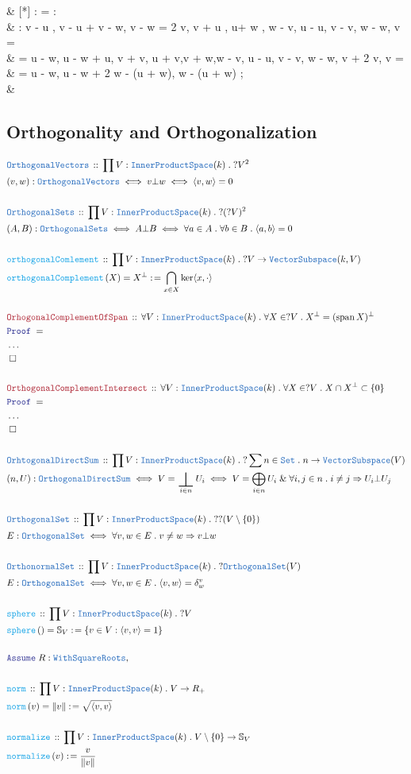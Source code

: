 \documentclass[12pt]{scrartcl}%
\newcommand{\TYPE}[1]{\textcolor{NavyBlue}{\mathtt{#1}}}%
\newcommand{\FUNC}[1]{\textcolor{Cerulean}{\mathtt{#1}}}%
\newcommand{\LOGIC}[1]{\textcolor{Blue}{\mathtt{#1}}}%
\newcommand{\THM}[1]{\textcolor{Maroon}{\mathtt{#1}}}%
\renewcommand{\.}{\; . \;} %
\newcommand{\de}{: \kern 0.1pc =} %
\newcommand{\Act}[1]{\left( #1 \right)} %
\newcommand{\Theorem}[2]{& \THM{#1} \, :: \, #2 \\ & \Proof = \\ } %
\newcommand{\DeclareType}[2]{& \TYPE{#1} \, :: \, #2 \\}%
\newcommand{\DefineType}[3]{& #1 : \TYPE{#2} \iff #3 \\}%
\newcommand{\DefineNamedType}[4]{& #1 : \TYPE{#2} \iff #3 \iff #4 \\}%
\newcommand{\DeclareFunc}[2]{& \FUNC{#1} \, :: \, #2 \\}%
\newcommand{\DefineFunc}[3]{&  \FUNC{#1}\Act{#2} \de #3 \\}%
\newcommand{\DefineNamedFunc}[4]{&  \FUNC{#1}\Act{#2} = #3 \de #4 \\}%
\newcommand{\NewLine}{\\ & \kern 1pc}%
\newcommand{\Page}[1]{ \begin{align*} #1 \end{align*}  }%
\newcommand{\NoProof}{ & \ldots \\ \EndProof}%
\renewcommand{\And}{\; \& \;}%
\newcommand{\Set}{\TYPE{Set}} %
\newcommand{\Conclude}[3]{& #1 \de #2 : #3; \\}%
\newcommand{\Assume}[2]{& \LOGIC{Assume} \; #1 : #2, \\} %
\newcommand{\QED}{\; \square} %
\newcommand{\EndProof}{& \QED \\} %
\newcommand{\Proof}{\LOGIC{Proof} \; } %
\newcommand{\IPS}{\TYPE{InnerProductSpace}}
\DeclareMathOperator{\Span}{span} %
\DeclareMathOperator{\bigbot}{\scalerel*{\bot}{\sum}} %
\begin{document}
{{	}
	\Conclude{[*]}{}
	{
		\NewLine :
		\langle v - u , v - u \rangle + \langle v - w, v - w \rangle =  
		2 \langle v, v \rangle  + \langle u , u\rangle + \langle w , w \rangle 
		- \langle v, u \rangle - \langle u, v \rangle - \langle v, w \rangle - \langle w, v \rangle = \NewLine =
		\frac{1}{2}\langle u - w, u - w \rangle  + \frac{1}{2}\langle u, v \rangle + \frac{1}{2}\langle v, u \rangle + 
		\frac{1}{2}\langle v,v \rangle + \frac{1}{2}\langle w,w \rangle
		- \langle v, u \rangle - \langle u, v \rangle - \langle v, w \rangle - \langle w, v \rangle + 
		2 \langle v, v \rangle  = \NewLine = 
		\frac{1}{2}\langle u - w, u - w \rangle  +  2 \left\langle w - \frac{1}{2}(u + w), w - \frac{1}{2}(u + w)  \right\rangle
	}
	\EndProof
}
\newpage
\subsection{Orthogonality and Orthogonalization}
\Page{
	\DeclareType{OrthogonalVectors}{\prod V : \IPS(k) \. ?V^2}
	\DefineNamedType{(v,w)}{OrthogonalVectors}{v \bot w}{\langle v, w \rangle = 0}
	\\
	\DeclareType{OrthogonalSets}{\prod V : \IPS(k) \. ?(?V)^2}
	\DefineNamedType{(A,B)}{OrthogonalSets}{A \bot B}{\forall a \in A \. \forall b \in B \. \langle a, b \rangle = 0}
	\\
	\DeclareFunc{orthogonalComlement}{\prod V : \IPS(k) \. ?V \to \TYPE{VectorSubspace}(k,V) }
	\DefineNamedFunc{orthogonalComplement}{X}{X^\bot}{\bigcap_{x \in X} \ker \langle x, \cdot \rangle}
	\\
	\Theorem{OrhogonalComplementOfSpan}{\forall V : \IPS(k) \.  \forall X \in ?V \. X^{\bot} = (\Span X)^\bot}
	\NoProof
	\\
	\Theorem{OrthogonalComplementIntersect}{\forall V : \IPS(k) \. \forall X \in ?V \. X \cap X^{\bot} \subset \{0\}}
	\NoProof
	\\
	\DeclareType{OrhtogonalDirectSum}{\prod V : \IPS(k) \. ? \sum n \in \Set \. n \to \TYPE{VectorSubspace}(V)}
	\DefineNamedType{(n,U)}{OrthogonalDirectSum}{V = \bigbot_{i \in n} U_i}
	{ V = \bigoplus_{i \in n } U_i \And \forall i,j \in n \. i \neq j \Rightarrow U_i \bot U_j}
	\\
	\DeclareType{OrthogonalSet}{\prod V : \IPS(k) \. ??(V \setminus \{0\})}
	\DefineType{E}{OrthogonalSet}{ \forall v,w \in E \. v \neq w \Rightarrow v \bot w }
	\\
	\DeclareType{OrthonormalSet}{\prod V : \IPS(k) \. ?\TYPE{OrthogonalSet}(V)}
	\DefineType{E}{OrthogonalSet}{ \forall v,w \in E \. \langle v,w \rangle = \delta^v_w}
	\\
	\DeclareFunc{sphere}{ \prod V : \IPS(k) \. ?V }
	\DefineNamedFunc{sphere}{}{\mathbb{S}_V}{\{ v \in V : \langle v, v \rangle = 1\}}
	\\
	\Assume{R}{\TYPE{WithSquareRoots}}
	\\
	\DeclareFunc{norm}{\prod V : \IPS(k) \. V \to R_+}
	\DefineNamedFunc{norm}{v}{\|v\|}{\sqrt{\langle v,v \rangle}}
	\\
	\DeclareFunc{normalize}{\prod V : \IPS(k) \. V \setminus \{0\} \to \mathbb{S}_V}
	\DefineFunc{normalize}{v}{\frac{v}{\|v\|}}
}
\end{document}
